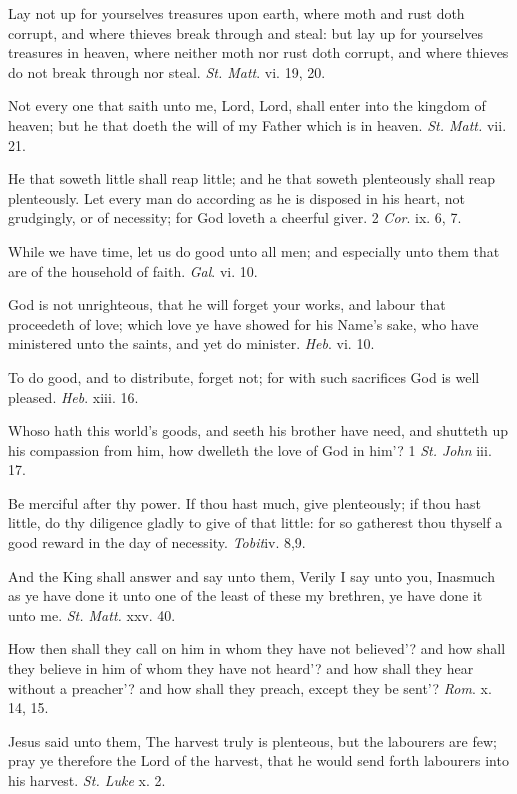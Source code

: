 Lay not up for yourselves treasures upon earth, where
moth and rust doth corrupt, and where thieves break through and steal:
but lay up for yourselves treasures in heaven, where neither moth nor
rust doth corrupt, and where thieves do not break through nor steal. \emph{St.
Matt}. vi. 19, 20.

Not every one that saith unto me, Lord, Lord, shall
enter into the kingdom of heaven; but he that doeth the will of my Father
which is in heaven. \emph{St. Matt.} vii. 21.

He that soweth little shall reap little; and he that
soweth plenteously shall reap plenteously. Let every man do according
as he is disposed in his heart, not grudgingly, or of necessity; for God
loveth a cheerful giver. 2 \emph{Cor}. ix. 6, 7.

While we have time, let us do good unto all men; and
especially unto them that are of the household of faith. \emph{Gal}.
vi. 10.

God is not unrighteous, that he will forget your works,
and labour that proceedeth of love; which love ye have showed for his
Name’s sake, who have ministered unto the saints, and yet do minister.
\emph{Heb}. vi. 10.

To do good, and to distribute, forget not; for with
such sacrifices God is well pleased. \emph{Heb}. xiii. 16.

Whoso hath this world’s goods, and seeth his
brother have need, and shutteth up his compassion from him, how dwelleth
the love of God in him’? 1 \emph{St. John} iii. 17.

Be merciful after thy power. If thou hast much, give
plenteously; if thou hast little, do thy diligence gladly to give of that
little: for so gatherest thou thyself a good reward in the day of necessity.
\emph{Tobit}iv. 8,9.

And the King shall answer and say unto them, Verily
I say unto you, Inasmuch as ye have done it unto one of the least of these
my brethren, ye have done it unto me. \emph{St. Matt.} xxv. 40.

How then shall they call on him in whom they have not
believed’? and how shall they believe in him of whom they have not
heard’? and how shall they hear without a preacher’? and how
shall they preach, except they be sent’? \emph{Rom}. x.
14, 15.

Jesus said unto them, The harvest truly is plenteous,
but the labourers are few; pray ye therefore the Lord of the harvest,
that he would send forth labourers into his harvest. \emph{St. Luke}
x. 2.

